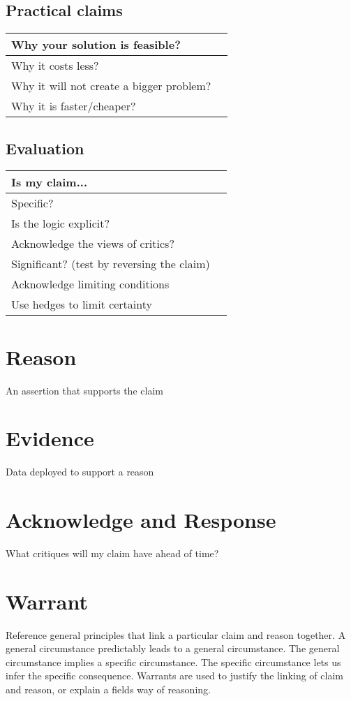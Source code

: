 \documentclass[10pt, a4paper]{article}
\begin{document}
	\subsection{Practical claims}
	\begin{center}
		\begin{tabular}{|l |l|}
			\hline
			Why your solution is feasible? &\\
			\hline
			Why it costs less?&\\
			\hline
			Why it will not create a bigger problem?&\\
			\hline
			Why it is faster/cheaper?&\\
			\hline
		\end{tabular}
	\end{center}
	\subsection{Evaluation}
		\begin{center}
		\begin{tabular}{|l |l|}
			\hline
			Is my claim... &\\
			\hline
			Specific?&\\
			\hline
			Is the logic explicit?&\\
			\hline
			Acknowledge the views of critics?&\\
			\hline
			Significant? (test by reversing the claim)&\\
			\hline
			Acknowledge limiting conditions&\\
			\hline
			Use hedges to limit certainty&\\
			\hline
		\end{tabular}
	\end{center}
	\section{Reason}
	An assertion that supports the claim
	\section{Evidence}
	Data deployed to support a reason 
	\section{Acknowledge and Response}
	What critiques will my claim have ahead of time?
	\section{Warrant}
	Reference general principles that link a particular claim and reason together. 
	A general circumstance predictably leads to a general circumstance. The general circumstance implies a specific circumstance. The specific circumstance lets us infer the specific consequence. Warrants are used to justify the linking of claim and reason, or explain a fields way of reasoning. 
	
	
	
	
\end{document}
